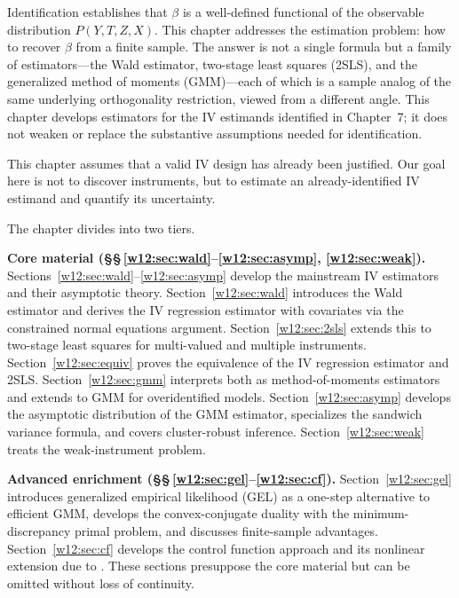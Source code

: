 \documentclass[master.tex]{subfiles}
\begin{document}
Identification establishes that $\beta$ is a well-defined functional
of the observable distribution $P(Y, T, Z, X)$.  This chapter
addresses the estimation problem: how to recover $\beta$ from a
finite sample.  The answer is not a single formula but a family of
estimators---the Wald estimator, two-stage least squares (2SLS), and
the generalized method of moments (GMM)---each of which is a sample
analog of the same underlying orthogonality restriction, viewed from
a different angle.  This chapter develops estimators for the IV
estimands identified in Chapter~7; it does not weaken or replace the
substantive assumptions needed for identification.

This chapter assumes that a valid IV design has already been
justified.  Our goal here is not to discover instruments, but to
estimate an already-identified IV estimand and quantify its
uncertainty.

The chapter divides into two tiers.

\medskip\noindent\textbf{Core material
(\S\S\,\ref{w12:sec:wald}--\ref{w12:sec:asymp},
 \ref{w12:sec:weak}).}
Sections~\ref{w12:sec:wald}--\ref{w12:sec:asymp} develop the
mainstream IV estimators and their asymptotic theory.
Section~\ref{w12:sec:wald} introduces the Wald estimator and derives
the IV regression estimator with covariates via the constrained normal
equations argument.
Section~\ref{w12:sec:2sls} extends this to two-stage least squares
for multi-valued and multiple instruments.
Section~\ref{w12:sec:equiv} proves the equivalence of the IV
regression estimator and 2SLS.
Section~\ref{w12:sec:gmm} interprets both as method-of-moments
estimators and extends to GMM for overidentified models.
Section~\ref{w12:sec:asymp} develops the asymptotic distribution of
the GMM estimator, specializes the sandwich variance formula, and
covers cluster-robust inference.
Section~\ref{w12:sec:weak} treats the weak-instrument problem.

\medskip\noindent\textbf{Advanced enrichment
(\S\S\,\ref{w12:sec:gel}--\ref{w12:sec:cf}).}
Section~\ref{w12:sec:gel} introduces generalized empirical likelihood
(GEL) as a one-step alternative to efficient GMM, develops the
convex-conjugate duality with the minimum-discrepancy primal problem,
and discusses finite-sample advantages.
Section~\ref{w12:sec:cf} develops the control function approach and
its nonlinear extension due to \citet{imbens2009}.
These sections presuppose the core material but can be omitted
without loss of continuity.


\end{document}

